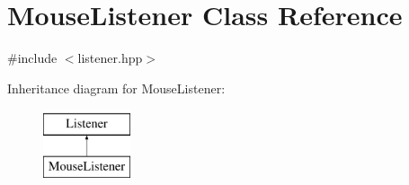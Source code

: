 \hypertarget{class_mouse_listener}{}\section{Mouse\+Listener Class Reference}
\label{class_mouse_listener}


{\ttfamily \#include $<$listener.\+hpp$>$}

Inheritance diagram for Mouse\+Listener\+:\begin{figure}[H]
\begin{center}
\leavevmode
\includegraphics[height=2.000000cm]{class_mouse_listener}
\end{center}
\end{figure}
